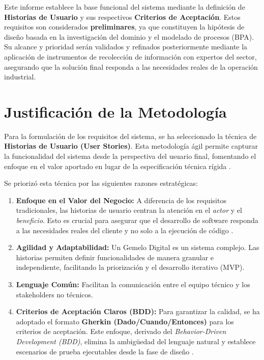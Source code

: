 \documentclass[12pt, a4paper]{article}
\begin{document}
Este informe establece la base funcional del sistema mediante la definición de \textbf{Historias de Usuario} y sus respectivos \textbf{Criterios de Aceptación}. Estos requisitos son considerados \textbf{preliminares}, ya que constituyen la hipótesis de diseño basada en la investigación del dominio y el modelado de procesos (BPA). Su alcance y prioridad serán validados y refinados posteriormente mediante la aplicación de instrumentos de recolección de información con expertos del sector, asegurando que la solución final responda a las necesidades reales de la operación industrial.

\section{Justificación de la Metodología}

Para la formulación de los requisitos del sistema, se ha seleccionado la técnica de \textbf{Historias de Usuario (User Stories)}. Esta metodología ágil permite capturar la funcionalidad del sistema desde la perspectiva del usuario final, fomentando el enfoque en el valor aportado en lugar de la especificación técnica rígida \parencite{cohn:2004}.

Se priorizó esta técnica por las siguientes razones estratégicas:

\begin{enumerate}
    \item \textbf{Enfoque en el Valor del Negocio:} A diferencia de los requisitos tradicionales, las historias de usuario centran la atención en el \textit{actor} y el \textit{beneficio}. Esto es crucial para asegurar que el desarrollo de software responda a las necesidades reales del cliente y no solo a la ejecución de código \parencite{cohn:2004}.
    \item \textbf{Agilidad y Adaptabilidad:} Un Gemelo Digital es un sistema complejo. Las historias permiten definir funcionalidades de manera granular e independiente, facilitando la priorización y el desarrollo iterativo (MVP).
    \item \textbf{Lenguaje Común:} Facilitan la comunicación entre el equipo técnico y los stakeholders no técnicos.
    \item \textbf{Criterios de Aceptación Claros (BDD):} Para garantizar la calidad, se ha adoptado el formato \textbf{Gherkin (Dado/Cuando/Entonces)} para los criterios de aceptación. Este enfoque, derivado del \textit{Behavior-Driven Development (BDD)}, elimina la ambigüedad del lenguaje natural y establece escenarios de prueba ejecutables desde la fase de diseño \parencite{wynne:2017}.
\end{enumerate}
\end{document}
